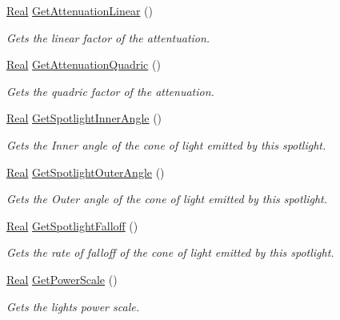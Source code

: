 \begin{DoxyCompactItemize}
\hyperlink{namespacephys_af7eb897198d265b8e868f45240230d5f}{Real} \hyperlink{classphys_1_1Light_acd3d3a2cf672fe18bd9e6d47676c2387}{GetAttenuationLinear} ()
\begin{DoxyCompactList}\small\item\em Gets the linear factor of the attentuation. \item\end{DoxyCompactList}\item 
\hyperlink{namespacephys_af7eb897198d265b8e868f45240230d5f}{Real} \hyperlink{classphys_1_1Light_a25d32e506ed943e8f5571edbaf2d16d6}{GetAttenuationQuadric} ()
\begin{DoxyCompactList}\small\item\em Gets the quadric factor of the attenuation. \item\end{DoxyCompactList}\item 
\hyperlink{namespacephys_af7eb897198d265b8e868f45240230d5f}{Real} \hyperlink{classphys_1_1Light_ab91651e77bf290dbcf9eef005307f081}{GetSpotlightInnerAngle} ()
\begin{DoxyCompactList}\small\item\em Gets the Inner angle of the cone of light emitted by this spotlight. \item\end{DoxyCompactList}\item 
\hyperlink{namespacephys_af7eb897198d265b8e868f45240230d5f}{Real} \hyperlink{classphys_1_1Light_a1f16eb63b48366c0cae7d139d51568d3}{GetSpotlightOuterAngle} ()
\begin{DoxyCompactList}\small\item\em Gets the Outer angle of the cone of light emitted by this spotlight. \item\end{DoxyCompactList}\item 
\hyperlink{namespacephys_af7eb897198d265b8e868f45240230d5f}{Real} \hyperlink{classphys_1_1Light_a498e84301731cb0cc9fa7c75cb0d752c}{GetSpotlightFalloff} ()
\begin{DoxyCompactList}\small\item\em Gets the rate of falloff of the cone of light emitted by this spotlight. \item\end{DoxyCompactList}\item 
\hyperlink{namespacephys_af7eb897198d265b8e868f45240230d5f}{Real} \hyperlink{classphys_1_1Light_a686dece4d19fbf37705e47e605f7fabf}{GetPowerScale} ()
\begin{DoxyCompactList}\small\item\em Gets the lights power scale. \item\end{DoxyCompactList}\end{DoxyCompactItemize}
